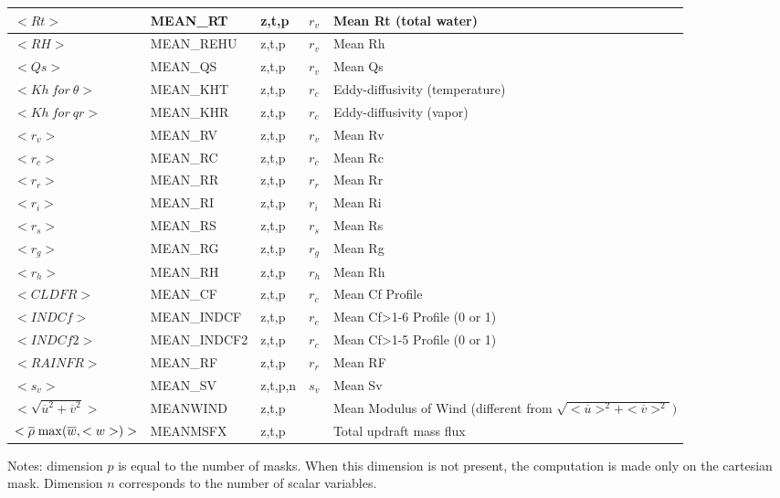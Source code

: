 \begin{longtable}[c]{|p{}|p{}|p{}|p{}|p{}|}
$<Rt>$              & MEAN\_RT     & z,t,p   & $r_v$ & Mean Rt (total water) \\\hline
$<RH>$              & MEAN\_REHU   & z,t,p   & $r_v$ & Mean Rh \\\hline
$<Qs>$              & MEAN\_QS     & z,t,p   & $r_v$ & Mean Qs \\\hline
$<Kh\ for\ \theta>$ & MEAN\_KHT    & z,t,p   & $r_c$ & Eddy-diffusivity (temperature) \\\hline
$<Kh\ for\ qr>$     & MEAN\_KHR    & z,t,p   & $r_c$ & Eddy-diffusivity (vapor) \\\hline
$<r_v>$             & MEAN\_RV     & z,t,p   & $r_v$ & Mean Rv \\\hline
$<r_c>$             & MEAN\_RC     & z,t,p   & $r_c$ & Mean Rc \\\hline
$<r_r>$             & MEAN\_RR     & z,t,p   & $r_r$ & Mean Rr \\\hline
$<r_i>$             & MEAN\_RI     & z,t,p   & $r_i$ & Mean Ri \\\hline
$<r_s>$             & MEAN\_RS     & z,t,p   & $r_s$ & Mean Rs \\\hline
$<r_g>$             & MEAN\_RG     & z,t,p   & $r_g$ & Mean Rg \\\hline
$<r_h>$             & MEAN\_RH     & z,t,p   & $r_h$ & Mean Rh \\\hline
$<CLDFR>$           & MEAN\_CF     & z,t,p   & $r_c$ & Mean Cf Profile \\\hline
$<INDCf>$           & MEAN\_INDCF  & z,t,p   & $r_c$ & Mean Cf>1-6 Profile (0 or 1) \\\hline
$<INDCf2>$          & MEAN\_INDCF2 & z,t,p   & $r_c$ & Mean Cf>1-5 Profile (0 or 1) \\\hline
$<RAINFR>$          & MEAN\_RF     & z,t,p   & $r_r$ & Mean RF \\\hline
$<s_v>$             & MEAN\_SV     & z,t,p,n & $s_v$ & Mean Sv \\\hline
$<\sqrt{\overline{u}^2+\overline{v}^2}>$ & MEANWIND & z,t,p &  & Mean Modulus of Wind (different from $\sqrt{<\overline{u}>^2+<\overline{v}>^2})$ \\
\hline
$<\overline{\rho} \;{\rm max}(\overline{w},<w>) >$  & MEANMSFX & z,t,p & & Total updraft mass flux \\\hline
\end{longtable}
\endgroup

Notes: dimension $p$ is equal to the number of masks. When this dimension is not present, the computation is made only on the cartesian mask. Dimension $n$ corresponds to the number of scalar variables.


